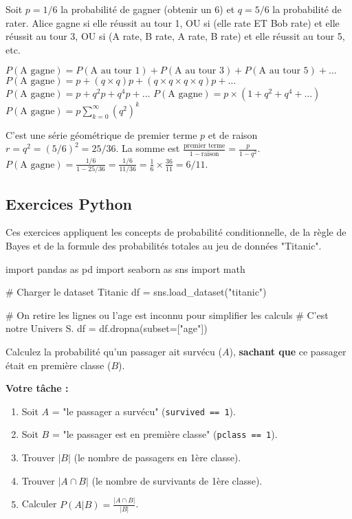 \begin{correctionbox}
Soit $p=1/6$ la probabilité de gagner (obtenir un 6) et $q=5/6$ la probabilité de rater.
Alice gagne si elle réussit au tour 1, OU si (elle rate ET Bob rate) et elle réussit au tour 3, OU si (A rate, B rate, A rate, B rate) et elle réussit au tour 5, etc.

$P(\text{A gagne}) = P(\text{A au tour 1}) + P(\text{A au tour 3}) + P(\text{A au tour 5}) + \dots$
$P(\text{A gagne}) = p + (q \times q)p + (q \times q \times q \times q)p + \dots$
$P(\text{A gagne}) = p + q^2 p + q^4 p + \dots$
$P(\text{A gagne}) = p \times (1 + q^2 + q^4 + \dots)$
$P(\text{A gagne}) = p \sum_{k=0}^{\infty} (q^2)^k$

C'est une série géométrique de premier terme $p$ et de raison $r = q^2 = (5/6)^2 = 25/36$.
La somme est $\frac{\text{premier terme}}{1 - \text{raison}} = \frac{p}{1 - q^2}$.
$P(\text{A gagne}) = \frac{1/6}{1 - 25/36} = \frac{1/6}{11/36} = \frac{1}{6} \times \frac{36}{11} = 6/11$.
\end{correctionbox}

\subsection{Exercices Python}

Ces exercices appliquent les concepts de probabilité conditionnelle, de la règle de Bayes et de la formule des probabilités totales au jeu de données "Titanic".

\begin{codecell}
import pandas as pd
import seaborn as sns
import math

# Charger le dataset Titanic
df = sns.load_dataset("titanic")

# On retire les lignes ou l'age est inconnu pour simplifier les calculs
# C'est notre Univers S.
df = df.dropna(subset=["age"]) 

\end{codecell}

\begin{exercicebox}
Calculez la probabilité qu'un passager ait survécu ($A$), \textbf{sachant que} ce passager était en première classe ($B$).

\textbf{Votre tâche :}
\begin{enumerate}
    \item Soit $A$ = "le passager a survécu" (\texttt{survived == 1}).
    \item Soit $B$ = "le passager est en première classe" (\texttt{pclass == 1}).
    \item Trouver $|B|$ (le nombre de passagers en 1ère classe).
    \item Trouver $|A \cap B|$ (le nombre de survivants de 1ère classe).
    \item Calculer $P(A|B) = \frac{|A \cap B|}{|B|}$.
\end{enumerate}
\end{exercicebox}

